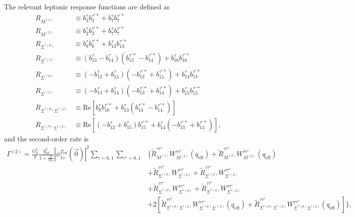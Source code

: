 \documentclass{book}[letterpaper,12pt]
\begin{document}
The relevant leptonic response functions are defined as
\begin{equation}
\begin{split}
R_{M^{(1)}}&\equiv b_3^{\tau}b_3^{\tau'*}+b_7^{\tau}b_7^{\tau'*}\\
R_{M^{(2)}}&\equiv b_2^{\tau}b_2^{\tau'*}+b_7^{\tau}b_7^{\tau'*}\\
R_{\Sigma^{''(0)}}&\equiv b_8^{\tau}b_8^{\tau'*}+b_{13}^{\tau}b_{13}^{\tau'*}\\
R_{\Sigma^{''(2)}}&\equiv (b_{13}^{\tau}-b_{14}^{\tau})(b_{13}^{\tau'*}-b_{14}^{\tau'*})+b_{16}^{\tau}b_{16}^{\tau'*}\\
R_{\Sigma^{'(0)}}&\equiv (-b_{12}^{\tau}+b_{15}^{\tau})(-b_{12}^{\tau'*}+b_{15}^{\tau'*})+b_{14}^{\tau}b_{14}^{\tau'*}\\
R_{\Sigma^{'(2)}}&\equiv (-b_{13}^{\tau}+b_{14}^{\tau})(-b_{13}^{\tau'*}+b_{14}^{\tau'*})+b_{15}^{\tau}b_{15}^{\tau'*}\\
R_{\Sigma^{''(0)}\Sigma^{''(2)}}&\equiv \mathrm{Re}\left[b_8^{\tau}b_{16}^{\tau'*}+b_{13}^{\tau}(b_{13}^{\tau'*}-b_{14}^{\tau'*})\right]\\
R_{\Sigma^{'(0)}\Sigma^{'(2)}}&\equiv \mathrm{Re}\left[(-b_{12}^{\tau}+b_{15}^{\tau})b_{15}^{\tau'*}+b_{14}^{\tau}(-b_{13}^{\tau'*}+b_{14}^{\tau'*})\right],
\end{split}
\end{equation}
and the second-order rate is
\begin{equation}
\begin{split}
\Gamma^{(2)}=\frac{G_F^2}{\pi}\frac{q_\mathrm{eff}^2}{1+\frac{q}{M_T}}|\phi_{1s}^{Z_\mathrm{eff}}(\vec{0})|^2\sum_{\tau=0,1}\sum_{\tau'=0,1}&\Bigg\{\tilde{R}_{M^{(1)}}^{\tau\tau'}W_{M^{(1)}}^{\tau\tau'}(q_\mathrm{eff})+\tilde{R}_{M^{(2)}}^{\tau\tau'}W_{M^{(2)}}^{\tau\tau'}(q_\mathrm{eff})\\
&+\tilde{R}_{\Sigma^{'(0)}}^{\tau\tau'}W_{\Sigma^{'(0)}}^{\tau\tau'}+\tilde{R}_{\Sigma^{'(2)}}^{\tau\tau'}W_{\Sigma^{'(2)}}^{\tau\tau'}\\
&+\tilde{R}_{\Sigma^{''(0)}}^{\tau\tau'}W_{\Sigma^{''(0)}}^{\tau\tau'}+\tilde{R}_{\Sigma^{''(2)}}^{\tau\tau'}W_{\Sigma^{''(2)}}^{\tau\tau'}\\
&+2\left[\tilde{R}_{\Sigma^{'(0)}\Sigma^{'(2)}}^{\tau\tau'}W_{\Sigma^{'(0)}\Sigma^{'(2)}}^{\tau\tau'}(q_\mathrm{eff})+\tilde{R}_{\Sigma^{''(0)}\Sigma^{''(2)}}^{\tau\tau'}W_{\Sigma^{''(0)}\Sigma^{'(2)}}^{\tau\tau'}(q_\mathrm{eff})\right]\Bigg\},
\end{split}
\end{equation}
\end{document}
